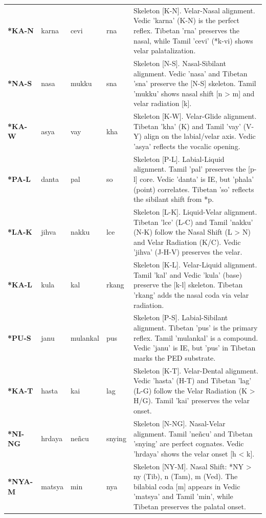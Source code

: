 \begin{longtable}{p{} p{} p{} p{} p{}}
\addlinespace[10pt]
\textbf{*KA-N} & karna & cevi & rna & \small Skeleton [K-N]. Velar-Nasal alignment. Vedic 'karna' (K-N) is the perfect reflex. Tibetan 'rna' preserves the nasal, while Tamil 'cevi' (*k-vi) shows velar palatalization. \\ 
\addlinespace[10pt]
\textbf{*NA-S} & nasa & mukku & sna & \small Skeleton [N-S]. Nasal-Sibilant alignment. Vedic 'nasa' and Tibetan 'sna' preserve the [N-S] skeleton. Tamil 'mukku' shows nasal shift [n > m] and velar radiation [k]. \\ 
\addlinespace[10pt]
\textbf{*KA-W} & asya & vay & kha & \small Skeleton [K-W]. Velar-Glide alignment. Tibetan 'kha' (K) and Tamil 'vay' (V-Y) align on the labial/velar axis. Vedic 'asya' reflects the vocalic opening. \\ 
\addlinespace[10pt]
\textbf{*PA-L} & danta & pal & so & \small Skeleton [P-L]. Labial-Liquid alignment. Tamil 'pal' preserves the [p-l] core. Vedic 'danta' is IE, but 'phala' (point) correlates. Tibetan 'so' reflects the sibilant shift from *p. \\ 
\addlinespace[10pt]
\textbf{*LA-K} & jihva & nakku & lce & \small Skeleton [L-K]. Liquid-Velar alignment. Tibetan 'lce' (L-C) and Tamil 'nakku' (N-K) follow the Nasal Shift (L > N) and Velar Radiation (K/C). Vedic 'jihva' (J-H-V) preserves the velar. \\ 
\addlinespace[10pt]
\textbf{*KA-L} & kula & kal & rkang & \small Skeleton [K-L]. Velar-Liquid alignment. Tamil 'kal' and Vedic 'kula' (base) preserve the [k-l] skeleton. Tibetan 'rkang' adds the nasal coda via velar radiation. \\ 
\addlinespace[10pt]
\textbf{*PU-S} & janu & mulankal & pus & \small Skeleton [P-S]. Labial-Sibilant alignment. Tibetan 'pus' is the primary reflex. Tamil 'mulankal' is a compound. Vedic 'janu' is IE, but 'pus' in Tibetan marks the PED substrate. \\ 
\addlinespace[10pt]
\textbf{*KA-T} & hasta & kai & lag & \small Skeleton [K-T]. Velar-Dental alignment. Vedic 'hasta' (H-T) and Tibetan 'lag' (L-G) follow the Velar Radiation (K > H/G). Tamil 'kai' preserves the velar onset. \\ 
\addlinespace[10pt]
\textbf{*NI-NG} & hrdaya & neñcu & snying & \small Skeleton [N-NG]. Nasal-Velar alignment. Tamil 'neñcu' and Tibetan 'snying' are perfect cognates. Vedic 'hrdaya' shows the velar onset [h < k]. \\ 
\addlinespace[10pt]
\textbf{*NYA-M} & matsya & min & nya & \small Skeleton [NY-M]. Nasal Shift: *NY > ny (Tib), n (Tam), m (Ved). The bilabial coda [m] appears in Vedic 'matsya' and Tamil 'min', while Tibetan preserves the palatal onset. \\ 

\end{longtable}

